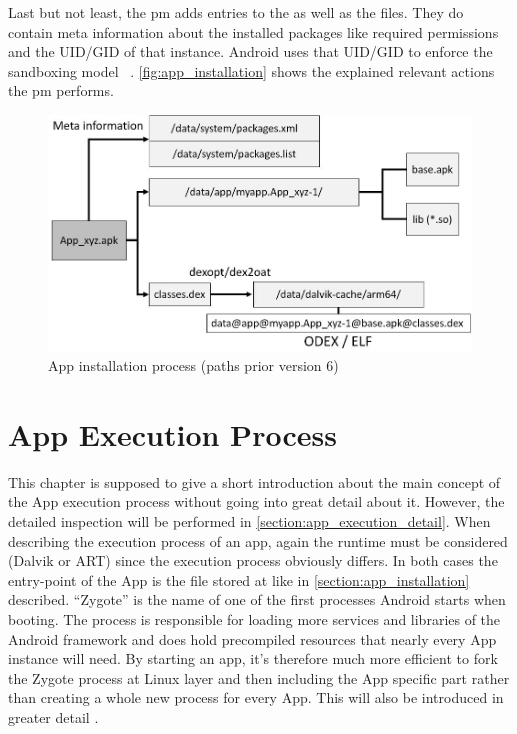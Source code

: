 Last but not least, the pm adds entries to the
 as well as the
 files. They do contain
meta information about the installed packages like
required permissions and the UID/GID of that instance.
Android uses that UID/GID to enforce the sandboxing model
~\parencite[ch.1]{securityinternals}.
\autoref{fig:app_installation} shows the explained
relevant actions the pm performs.

\begin{figure}[htb]
  \includegraphics[width=\textwidth]{figures/app_installation}
  \caption[App installation process (paths prior version 6)]{App installation process (paths prior version 6)}
  \label{fig:app_installation}
\end{figure}

\section{App Execution Process}\label{section:app_execution_simple}
This chapter is supposed to give a short introduction about the
main concept of the App execution process without going into
great detail about it. However, the detailed inspection will
be performed in \autoref{section:app_execution_detail}.
When describing the execution process of an app, again the
runtime must be considered (Dalvik or ART) since the execution process
obviously differs. In both cases the entry-point of the App is the
file stored at  like in
\autoref{section:app_installation} described. ``Zygote'' is
the name of one of the first processes Android starts when booting.
The process is responsible for loading more services and libraries
of the Android framework and does hold precompiled resources that
nearly every App instance will need.
By starting an app, it's therefore much more efficient to fork
the Zygote process at Linux layer and then including the App specific part
rather than  creating a whole new process for every App.
This will also be introduced in greater detail \parencite[ch.2]{hackershandbook}.

